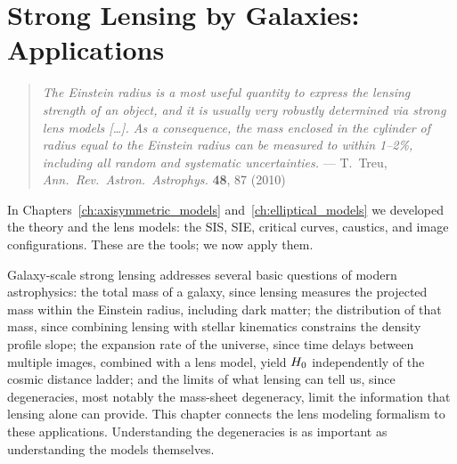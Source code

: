 
\chapter{Strong Lensing by Galaxies: Applications}
\label{ch:galaxy_lensing}

\begin{quote}
\textit{The Einstein radius is a most useful quantity to express the lensing strength
of an object, and it is usually very robustly determined via strong lens
models [\ldots].  As a consequence, the mass enclosed in the cylinder of radius
equal to the Einstein radius can be measured to within 1--2\%, including all
random and systematic uncertainties.}
\hfill --- T.~Treu, \textit{Ann.\ Rev.\ Astron.\ Astrophys.} \textbf{48}, 87 (2010)
\end{quote}

\noindent
In Chapters~\ref{ch:axisymmetric_models} and~\ref{ch:elliptical_models}
we developed the theory and the lens models: the SIS, SIE, critical
curves, caustics, and image configurations.  These are the tools;
we now apply them.

Galaxy-scale strong lensing addresses several basic questions of
modern astrophysics: the total mass of a galaxy, since lensing
measures the projected mass within the Einstein radius, including
dark matter; the distribution of that mass, since combining lensing
with stellar kinematics constrains the density profile slope; the
expansion rate of the universe, since time delays between multiple
images, combined with a lens model, yield $H_0$ independently of
the cosmic distance ladder; and the limits of what lensing can tell
us, since degeneracies, most notably the mass-sheet degeneracy,
limit the information that lensing alone can provide.  This chapter
connects the lens modeling formalism to these applications.
Understanding the degeneracies is as important as understanding the
models themselves.

